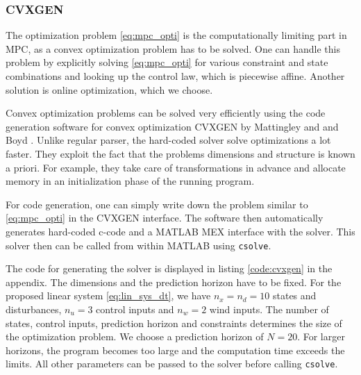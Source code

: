 \subsubsection{CVXGEN}
The optimization problem \ref{eq:mpc_opti} is the computationally limiting part in MPC, as a convex optimization problem has to be solved. One can handle this problem by explicitly solving \ref{eq:mpc_opti} for various constraint and state combinations and looking up the control law, which is piecewise affine. Another solution is online optimization, which we choose.

Convex optimization problems can be solved very efficiently using the code generation software for convex optimization CVXGEN by Mattingley and and Boyd \cite{Mattingley2010}. Unlike regular parser, the hard-coded solver solve optimizations a lot faster. They exploit the fact that the problems dimensions and structure is known a priori. For example, they take care of transformations in advance and allocate memory in an initialization phase of the running program.

For code generation, one can simply write down the problem similar to \ref{eq:mpc_opti} in the CVXGEN interface. The software then automatically generates hard-coded c-code and a MATLAB MEX interface with the solver. This solver then can be called from within MATLAB using \texttt{csolve}.

The code for generating the solver is displayed in listing \ref{code:cvxgen} in the appendix. The dimensions and the prediction horizon have to be fixed. For the proposed linear system \ref{eq:lin_sys_dt}, we have $n_x=n_d=10$ states and disturbances, $n_u=3$ control inputs and $n_w=2$ wind inputs. The number of states, control inputs, prediction horizon and constraints determines the size of the optimization problem. We choose a prediction horizon of $N=20$. For larger horizons, the program becomes too large and the computation time exceeds the limits. All other parameters can be passed to the solver before calling \texttt{csolve}.

